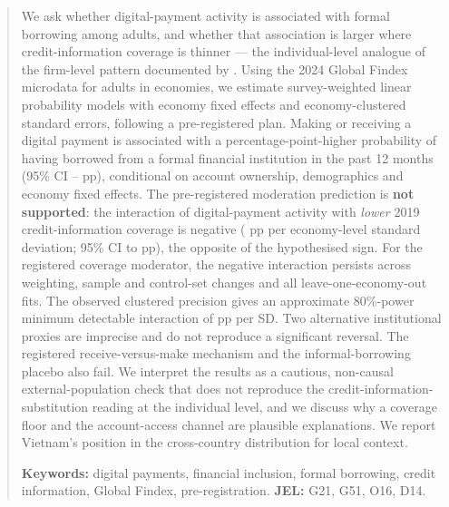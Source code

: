 
\begin{abstract}
\noindent We ask whether digital-payment activity is associated with formal borrowing
among adults, and whether that association is larger where credit-information coverage is
thinner --- the individual-level analogue of the firm-level pattern documented by
\citet{GalileaFaraziMare2026}. Using the 2024 Global Findex microdata for \NAdults{} adults
in \NEconomies{} economies, we estimate survey-weighted linear probability models with
economy fixed effects and economy-clustered standard errors, following a pre-registered
plan. Making or receiving a digital payment is associated with a \MOneBeta{}
percentage-point-higher probability of having borrowed from a formal financial institution
in the past 12 months (95\% CI \MOneCIlo{}--\MOneCIhi{} pp), conditional on account
ownership, demographics and economy fixed effects. The pre-registered moderation prediction
is \textbf{not supported}: the interaction of digital-payment activity with \emph{lower}
2019 credit-information coverage is negative (\MTwoBetaThree{} pp per economy-level standard
deviation; 95\% CI \MTwoBetaThreeCIlo{} to \MTwoBetaThreeCIhi{} pp), the opposite of the
hypothesised sign. For the registered coverage moderator, the negative interaction persists
across weighting, sample and control-set changes and all \NEconomies{} leave-one-economy-out
fits. The observed clustered precision gives an approximate 80\%-power minimum detectable
interaction of \MDEpp{} pp per SD. Two alternative institutional proxies are imprecise and
do not reproduce a significant reversal. The registered receive-versus-make mechanism and
the informal-borrowing placebo also fail. We interpret the results as a cautious, non-causal
external-population check that does not reproduce the credit-information-substitution reading
at the individual level, and we discuss why a coverage floor and the account-access channel
are plausible explanations. We report Vietnam's position in the cross-country distribution
for local context.

\medskip
\noindent\textbf{Keywords:} digital payments, financial inclusion, formal borrowing, credit
information, Global Findex, pre-registration. \quad\textbf{JEL:} G21, G51, O16, D14.
\end{abstract}


